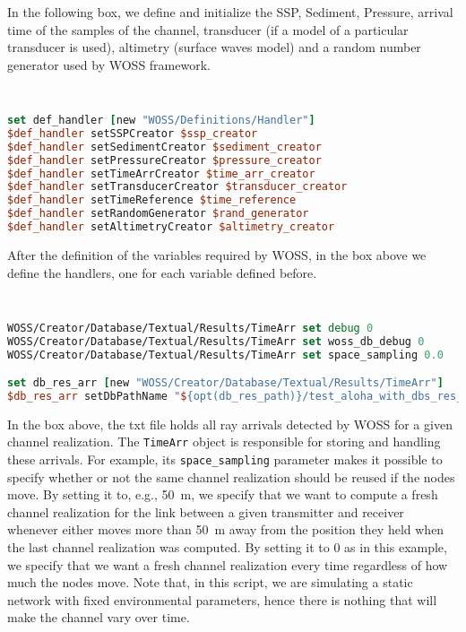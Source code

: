 \documentclass[11pt]{article}
\begin{document}
\vspace{\baselinestretch\baselineskip}

In the following box, we define and initialize the SSP, Sediment, Pressure, arrival time of the samples of the channel, transducer (if a model of a particular transducer is used), altimetry (surface waves model) and a random number generator used by WOSS framework.

{\scriptsize\tt
\begin{lstlisting}[language=tcl]
set def_handler [new "WOSS/Definitions/Handler"]
$def_handler setSSPCreator $ssp_creator
$def_handler setSedimentCreator $sediment_creator
$def_handler setPressureCreator $pressure_creator
$def_handler setTimeArrCreator $time_arr_creator
$def_handler setTransducerCreator $transducer_creator
$def_handler setTimeReference $time_reference
$def_handler setRandomGenerator $rand_generator
$def_handler setAltimetryCreator $altimetry_creator
\end{lstlisting}
}

\clearpage

After the definition of the variables required by WOSS, in the box above we define the handlers, one for each variable defined before.

{\scriptsize\tt
\begin{lstlisting}[language=tcl]
WOSS/Creator/Database/Textual/Results/TimeArr set debug 0
WOSS/Creator/Database/Textual/Results/TimeArr set woss_db_debug 0
WOSS/Creator/Database/Textual/Results/TimeArr set space_sampling 0.0

set db_res_arr [new "WOSS/Creator/Database/Textual/Results/TimeArr"]
$db_res_arr setDbPathName "${opt(db_res_path)}/test_aloha_with_dbs_res_arr.txt"
\end{lstlisting}
}

In the box above, the txt file holds all ray arrivals detected by WOSS for a given channel realization. The {\tt TimeArr} object is responsible for storing and handling these arrivals. For example, its {\tt space\_sampling} parameter makes it possible to specify whether or not the same channel realization should be reused if the nodes move. By setting it to, e.g., 50~m, we specify that we want to compute a fresh channel realization for the link between a given transmitter and receiver whenever either moves more than 50~m away from the position they held when the last channel realization was computed. By setting it to 0 as in this example, we specify that we want a fresh channel realization every time regardless of how much the nodes move. Note that, in this script, we are simulating a static network with fixed environmental parameters, hence there is nothing that will make the channel vary over time.\\
\end{document}
